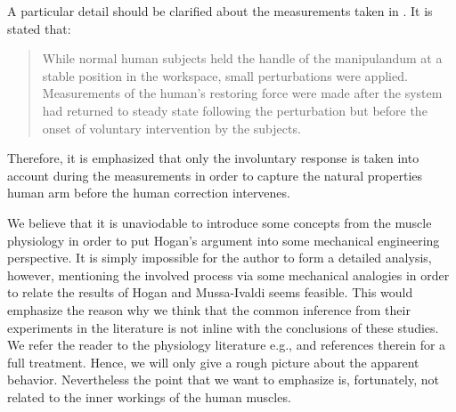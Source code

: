 \begin{rem}\label{rem:filament}
A particular detail should be clarified about the measurements taken in \cite{hogan89}. It is stated that: 
\begin{quote}
While normal human subjects held the handle of the manipulandum at a stable position
in the workspace, small perturbations were applied. Measurements
of the human's restoring force were made after the system
had returned to steady state following the perturbation but before
the onset of voluntary intervention by the subjects.
\end{quote}
Therefore, it is emphasized that only the involuntary response is taken into account during the measurements in order to
capture the natural properties human arm before the human correction intervenes. 
%
%
\end{rem}

We believe that it is unaviodable to introduce some concepts from the muscle physiology in order to put Hogan's 
argument into some mechanical engineering perspective. It is simply impossible for the author to form a detailed analysis, 
however, mentioning the involved process via some mechanical analogies in order to relate the results of 
Hogan and Mussa-Ivaldi seems feasible. This would emphasize the reason why we think that the common inference from their experiments 
in the literature is not inline with the conclusions of these studies.
We refer the reader to the physiology literature e.g., \cite{spudich,millman,offer,horowits,yildiz} and references therein for a full treatment. Hence, we 
will only give a rough picture about the apparent behavior. Nevertheless the point that we want to emphasize is, fortunately, 
not related to the inner workings of the human muscles.



